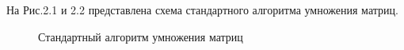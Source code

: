 \documentclass[a4paper,12pt]{report}
\begin{document}
\hspace{0.6cm}На Рис.2.1 и 2.2 представлена схема стандартного алгоритма умножения матриц.
\begin{figure}[ht!]
\caption{Стандартный алгоритм умножения матриц}
\newpage
\end{figure}
\newpage
\end{document}
